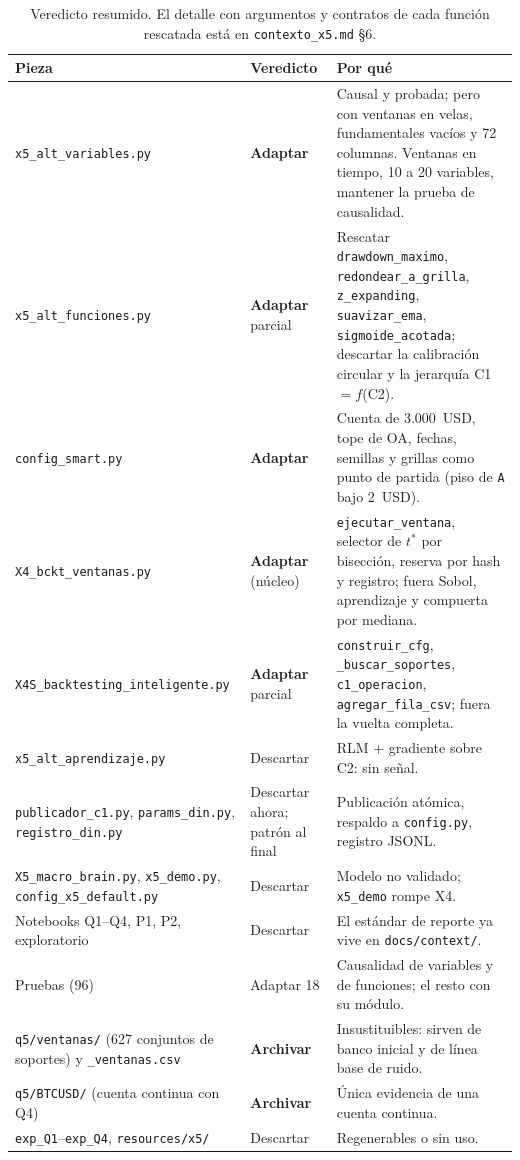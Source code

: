 \documentclass[11pt,a4paper]{article}
\newcommand{\code}[1]{\texttt{\small #1}}
\begin{document}
\begin{table}[H]
\centering\footnotesize
\begin{tabularx}{\linewidth}{>{\raggedright\arraybackslash}p{4.4cm}lX}
\toprule
Pieza & Veredicto & Por qué \\
\midrule
\code{x5\_alt\_variables.py} & \textbf{Adaptar} & Causal y probada; pero con ventanas en velas, fundamentales vacíos y 72 columnas. Ventanas en tiempo, 10 a 20 variables, mantener la prueba de causalidad. \\
\code{x5\_alt\_funciones.py} & \textbf{Adaptar} parcial & Rescatar \code{drawdown\_maximo}, \code{redondear\_a\_grilla}, \code{z\_expanding}, \code{suavizar\_ema}, \code{sigmoide\_acotada}; descartar la calibración circular y la jerarquía C1$=f$(C2). \\
\code{config\_smart.py} & \textbf{Adaptar} & Cuenta de 3.000~USD, tope de OA, fechas, semillas y grillas como punto de partida (piso de \code{A} bajo 2~USD). \\
\code{X4\_bckt\_ventanas.py} & \textbf{Adaptar} (núcleo) & \code{ejecutar\_ventana}, selector de $t^*$ por bisección, reserva por hash y registro; fuera Sobol, aprendizaje y compuerta por mediana. \\
\code{X4S\_backtesting\_inteligente.py} & \textbf{Adaptar} parcial & \code{construir\_cfg}, \code{\_buscar\_soportes}, \code{c1\_operacion}, \code{agregar\_fila\_csv}; fuera la vuelta completa. \\
\code{x5\_alt\_aprendizaje.py} & Descartar & RLM + gradiente sobre C2: sin señal. \\
\code{publicador\_c1.py}, \code{params\_din.py}, \code{registro\_din.py} & Descartar ahora; patrón al final & Publicación atómica, respaldo a \code{config.py}, registro JSONL. \\
\code{X5\_macro\_brain.py}, \code{x5\_demo.py}, \code{config\_x5\_default.py} & Descartar & Modelo no validado; \code{x5\_demo} rompe X4. \\
Notebooks Q1--Q4, P1, P2, exploratorio & Descartar & El estándar de reporte ya vive en \code{docs/context/}. \\
Pruebas (96) & Adaptar 18 & Causalidad de variables y de funciones; el resto con su módulo. \\
\code{q5/ventanas/} (627 conjuntos de soportes) y \code{*\_ventanas.csv} & \textbf{Archivar} & Insustituibles: sirven de banco inicial y de línea base de ruido. \\
\code{q5/BTCUSD/} (cuenta continua con Q4) & \textbf{Archivar} & Única evidencia de una cuenta continua. \\
\code{exp\_Q1}--\code{exp\_Q4}, \code{resources/x5/} & Descartar & Regenerables o sin uso. \\
\bottomrule
\end{tabularx}
\caption{Veredicto resumido. El detalle con argumentos y contratos de cada función rescatada está en \code{contexto\_x5.md} \S6.}
\end{table}
\end{document}
